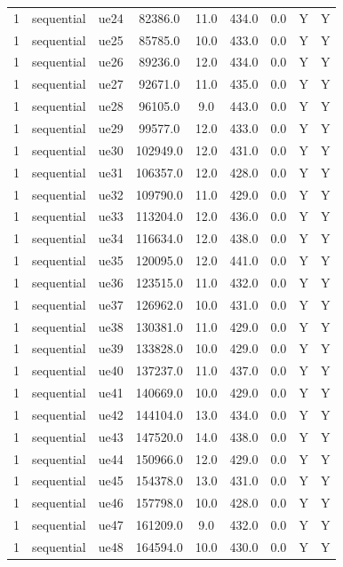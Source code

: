 \begin{table}[ht]
\begin{tabular}{|c|c|c|c|c|c|c|c|c|}
1 & sequential & ue24 & 82386.0 & 11.0 & 434.0 & 0.0 & Y & Y \\
1 & sequential & ue25 & 85785.0 & 10.0 & 433.0 & 0.0 & Y & Y \\
1 & sequential & ue26 & 89236.0 & 12.0 & 434.0 & 0.0 & Y & Y \\
1 & sequential & ue27 & 92671.0 & 11.0 & 435.0 & 0.0 & Y & Y \\
1 & sequential & ue28 & 96105.0 & 9.0 & 443.0 & 0.0 & Y & Y \\
1 & sequential & ue29 & 99577.0 & 12.0 & 433.0 & 0.0 & Y & Y \\
1 & sequential & ue30 & 102949.0 & 12.0 & 431.0 & 0.0 & Y & Y \\
1 & sequential & ue31 & 106357.0 & 12.0 & 428.0 & 0.0 & Y & Y \\
1 & sequential & ue32 & 109790.0 & 11.0 & 429.0 & 0.0 & Y & Y \\
1 & sequential & ue33 & 113204.0 & 12.0 & 436.0 & 0.0 & Y & Y \\
1 & sequential & ue34 & 116634.0 & 12.0 & 438.0 & 0.0 & Y & Y \\
1 & sequential & ue35 & 120095.0 & 12.0 & 441.0 & 0.0 & Y & Y \\
1 & sequential & ue36 & 123515.0 & 11.0 & 432.0 & 0.0 & Y & Y \\
1 & sequential & ue37 & 126962.0 & 10.0 & 431.0 & 0.0 & Y & Y \\
1 & sequential & ue38 & 130381.0 & 11.0 & 429.0 & 0.0 & Y & Y \\
1 & sequential & ue39 & 133828.0 & 10.0 & 429.0 & 0.0 & Y & Y \\
1 & sequential & ue40 & 137237.0 & 11.0 & 437.0 & 0.0 & Y & Y \\
1 & sequential & ue41 & 140669.0 & 10.0 & 429.0 & 0.0 & Y & Y \\
1 & sequential & ue42 & 144104.0 & 13.0 & 434.0 & 0.0 & Y & Y \\
1 & sequential & ue43 & 147520.0 & 14.0 & 438.0 & 0.0 & Y & Y \\
1 & sequential & ue44 & 150966.0 & 12.0 & 429.0 & 0.0 & Y & Y \\
1 & sequential & ue45 & 154378.0 & 13.0 & 431.0 & 0.0 & Y & Y \\
1 & sequential & ue46 & 157798.0 & 10.0 & 428.0 & 0.0 & Y & Y \\
1 & sequential & ue47 & 161209.0 & 9.0 & 432.0 & 0.0 & Y & Y \\
1 & sequential & ue48 & 164594.0 & 10.0 & 430.0 & 0.0 & Y & Y \\

\end{tabular}
\end{table}
